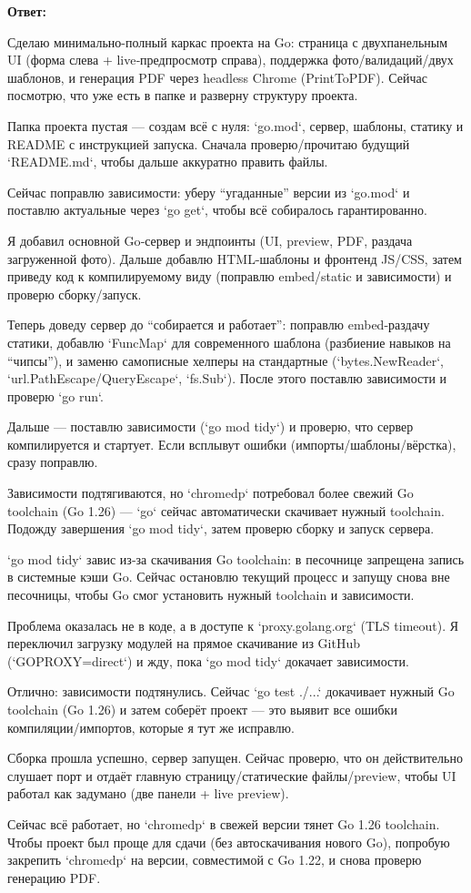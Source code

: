 \documentclass[a4paper, 14pt]{extarticle} %
\begin{document}
\textbf{Ответ:}

\begin{AnswerBlock}

Сделаю минимально-полный каркас проекта на Go: страница с двухпанельным UI (форма слева + live‑предпросмотр справа), поддержка фото/валидаций/двух шаблонов, и генерация PDF через headless Chrome (PrintToPDF). Сейчас посмотрю, что уже есть в папке и разверну структуру проекта.

Папка проекта пустая — создам всё с нуля: `go.mod`, сервер, шаблоны, статику и README с инструкцией запуска. Сначала проверю/прочитаю будущий `README.md`, чтобы дальше аккуратно править файлы.

Сейчас поправлю зависимости: уберу “угаданные” версии из `go.mod` и поставлю актуальные через `go get`, чтобы всё собиралось гарантированно.

Я добавил основной Go‑сервер и эндпоинты (UI, preview, PDF, раздача загруженной фото). Дальше добавлю HTML-шаблоны и фронтенд JS/CSS, затем приведу код к компилируемому виду (поправлю embed/static и зависимости) и проверю сборку/запуск.

Теперь доведу сервер до “собирается и работает”: поправлю embed-раздачу статики, добавлю `FuncMap` для современного шаблона (разбиение навыков на “чипсы”), и заменю самописные хелперы на стандартные (`bytes.NewReader`, `url.PathEscape/QueryEscape`, `fs.Sub`). После этого поставлю зависимости и проверю `go run`.

Дальше — поставлю зависимости (`go mod tidy`) и проверю, что сервер компилируется и стартует. Если всплывут ошибки (импорты/шаблоны/вёрстка), сразу поправлю.

Зависимости подтягиваются, но `chromedp` потребовал более свежий Go toolchain (Go 1.26) — `go` сейчас автоматически скачивает нужный toolchain. Подожду завершения `go mod tidy`, затем проверю сборку и запуск сервера.

`go mod tidy` завис из‑за скачивания Go toolchain: в песочнице запрещена запись в системные кэши Go. Сейчас остановлю текущий процесс и запущу снова вне песочницы, чтобы Go смог установить нужный toolchain и зависимости.

Проблема оказалась не в коде, а в доступе к `proxy.golang.org` (TLS timeout). Я переключил загрузку модулей на прямое скачивание из GitHub (`GOPROXY=direct`) и жду, пока `go mod tidy` докачает зависимости.

Отлично: зависимости подтянулись. Сейчас `go test ./...` докачивает нужный Go toolchain (Go 1.26) и затем соберёт проект — это выявит все ошибки компиляции/импортов, которые я тут же исправлю.

Сборка прошла успешно, сервер запущен. Сейчас проверю, что он действительно слушает порт и отдаёт главную страницу/статические файлы/preview, чтобы UI работал как задумано (две панели + live preview).

Сейчас всё работает, но `chromedp` в свежей версии тянет Go 1.26 toolchain. Чтобы проект был проще для сдачи (без автоскачивания нового Go), попробую закрепить `chromedp` на версии, совместимой с Go 1.22, и снова проверю генерацию PDF.

\end{AnswerBlock}
\end{document}
